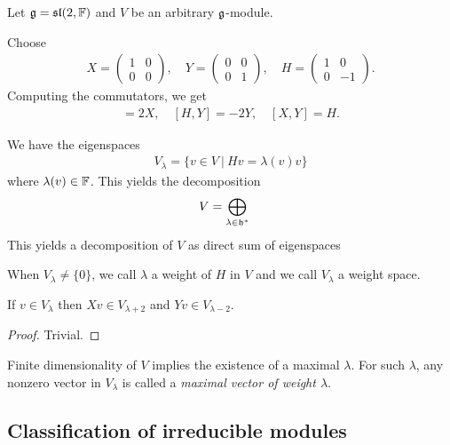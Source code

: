Let $\mathfrak{g}=\mathfrak{sl}(2,\mathbb{F})$ and $V$ be an arbitrary $\mathfrak{g}$-module.

Choose
\begin{align}
    X = \begin{pmatrix} 1 & 0 \\ 0 & 0 \end{pmatrix}, \quad
    Y = \begin{pmatrix} 0 & 0 \\ 0 & 1 \end{pmatrix}, \quad
    H = \begin{pmatrix} 1 & 0 \\ 0 & -1 \end{pmatrix}.
\end{align}
Computing the commutators, we get
\begin{align}
    [H,X] = 2X,\quad [H,Y]=-2Y,\quad [X,Y]=H.
\end{align}

We have the eigenspaces
\begin{align}
    V_\lambda = \{v\in V\ |\ H v = \lambda(v) v\}
\end{align}
where $\lambda(v)\in \mathbb{F}$. This yields the decomposition
\begin{align}
    V &= \bigoplus_{\lambda\in \mathfrak{h}^*} 
\end{align}
This yields a decomposition of $V$ as direct sum of eigenspaces 

When $V_\lambda \neq \{0\}$, we call $\lambda$ a weight of $H$ in $V$ and we call $V_\lambda$ a weight space.

\begin{lemma}
    If $v\in V_\lambda$ then $Xv \in V_{\lambda + 2}$ and $Yv\in V_{\lambda-2}$.
\end{lemma}
\begin{proof} Trivial.
\end{proof}
Finite dimensionality of $V$ implies the existence of a maximal $\lambda$. For such $\lambda$, any nonzero vector in $V_\lambda$ is called a \emph{maximal vector of weight $\lambda$}.

\subsection{Classification of irreducible modules}
\label{sub:classification_of_irreducible_modules}

